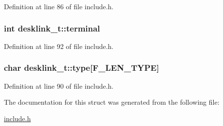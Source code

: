 Definition at line 86 of file include.\-h.

\hypertarget{structdesklink__t_a33ccf506137c32d9f2404beb6e913412}{
\subsubsection[{terminal}]{\setlength{\rightskip}{0pt plus 5cm}int desklink\-\_\-t\-::terminal}}\label{structdesklink__t_a33ccf506137c32d9f2404beb6e913412}


Definition at line 92 of file include.\-h.

\hypertarget{structdesklink__t_a79948cb813d8297cb011b9f9bd8a2ae4}{
\subsubsection[{type}]{\setlength{\rightskip}{0pt plus 5cm}char desklink\-\_\-t\-::type\mbox{[}{\bf F\-\_\-\-L\-E\-N\-\_\-\-T\-Y\-P\-E}\mbox{]}}}\label{structdesklink__t_a79948cb813d8297cb011b9f9bd8a2ae4}


Definition at line 90 of file include.\-h.



The documentation for this struct was generated from the following file\-:\begin{DoxyCompactItemize}
\item 
\hyperlink{include_8h}{include.\-h}\end{DoxyCompactItemize}
